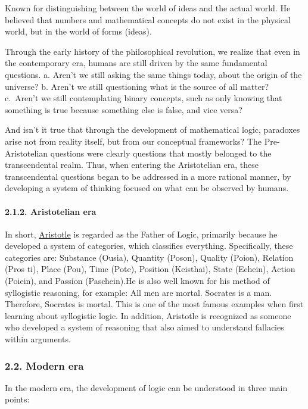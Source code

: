 Known for distinguishing between the world of ideas and the actual
world. He believed that numbers and mathematical concepts do not exist
in the physical world, but in the world of forms (ideas).

Through the early history of the philosophical revolution, we realize
that even in the contemporary era, humans are still driven by the same
fundamental questions. a. Aren't we still asking the same things today,
about the origin of the universe? b. Aren't we still questioning what is
the source of all matter? c.~Aren't we still contemplating binary
concepts, such as only knowing that something is true because something
else is false, and vice versa?

And isn't it true that through the development of mathematical logic,
paradoxes arise not from reality itself, but from our conceptual
frameworks? The Pre-Aristotelian questions were clearly questions that
mostly belonged to the transcendental realm. Thus, when entering the
Aristotelian era, these transcendental questions began to be addressed
in a more rational manner, by developing a system of thinking focused on
what can be observed by humans.

\paragraph{2.1.2. Aristotelian era}\label{aristotelian-era}

In short, \href{https://id.wikipedia.org/wiki/Aristoteles}{Aristotle} is
regarded as the Father of Logic, primarily because he developed a system
of categories, which classifies everything. Specifically, these
categories are: Substance (Ousia), Quantity (Poson), Quality (Poion),
Relation (Pros ti), Place (Pou), Time (Pote), Position (Keisthai), State
(Echein), Action (Poiein), and Passion (Paschein).He is also well known
for his method of syllogistic reasoning, for example: All men are
mortal. Socrates is a man. Therefore, Socrates is mortal. This is one of
the most famous examples when first learning about syllogistic logic. In
addition, Aristotle is recognized as someone who developed a system of
reasoning that also aimed to understand fallacies within arguments.

\subsubsection{2.2. Modern era}\label{modern-era}

In the modern era, the development of logic can be understood in three
main points:

